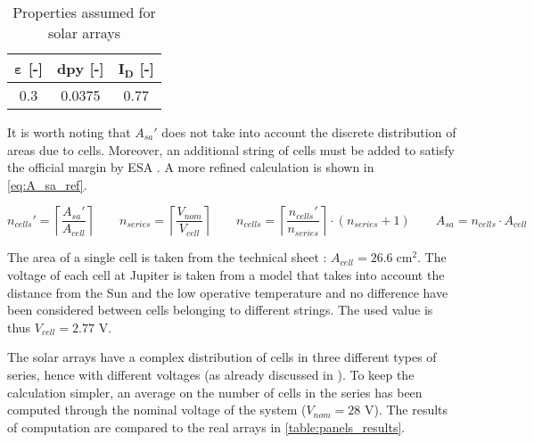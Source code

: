 % 

\begin{table}[H]
    \renewcommand{\arraystretch}{1.3}
    \centering
    \begin{tabular}{|c|c|c|}
        \hline
        $\boldsymbol{\varepsilon}$ \textbf{[-]}    &
        $\boldsymbol{dpy}$ \textbf{[-]}     &
        $\boldsymbol{I_D}$ \textbf{[-]}     \\
        \hline
        \hline
        0.3 & 0.0375 & 0.77 \\
        \hline
    \end{tabular}
    \caption{Properties assumed for solar arrays \mref}
    \label{table:panels_values}
\end{table}

It is worth noting that $A_{sa}'$ does not take into account the discrete distribution of areas due to cells.
Moreover, an additional string of cells must be added to satisfy the official margin by ESA \mref.
A more refined calculation is shown in \autoref{eq:A_sa_ref}.

\begin{equation}
    n_{cells}' = \left\lceil \frac{A_{sa}'}{A_{cell}} \right\rceil \qquad
    n_{series} = \left\lceil \frac{V_{nom}}{V_{cell}} \right\rceil \qquad
    n_{cells} = \left\lceil \frac{n_{cells}'}{n_{series}} \right\rceil
                \cdot \left( n_{series} + 1 \right) \qquad
    A_{sa} = n_{cells} \cdot A_{cell}
    \label{eq:A_sa_ref}
\end{equation}

The area of a single cell is taken from the technical sheet \mref: $A_{cell} = 26.6 \; \textrm{cm}^2$.
The voltage of each cell at Jupiter is taken from a model\cite{solar_panels_coef} that takes into account the distance from the Sun and the low operative temperature and no difference have been considered between cells belonging to different strings. The used value is thus $V_{cell} = 2.77$ V.

The solar arrays have a complex distribution of cells in three different types of series, hence with different voltages (as already discussed in \mref). %
To keep the calculation simpler, an average on the number of cells in the series has been computed through the nominal voltage of the system ($V_{nom} = 28$ V).
The results of computation are compared to the real arrays in \autoref{table:panels_results}.

